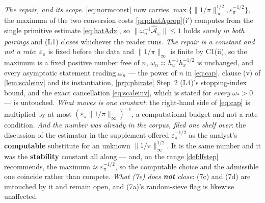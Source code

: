 \begin{remark}
\emph{The repair, and its scope.} \eqref{eq:normconst} now carries
$\max\{\|1/\pi\|_\infty^{1/2},\varepsilon_\pi^{-1/2}\}$, the maximum of the two conversion costs
\cref{prp:hatAprop}\textup{(i$'$)} computes from the single primitive estimate \eqref{eq:hatAdx}, so
$\|\omega_n^{-1}\hat{\mathcal A}_\varphi\|\le1$ holds \emph{surely in both pairings} and \textup{(L1)}
closes whichever the reader runs. \emph{The repair is a constant and not a rate}: $\varepsilon_\pi$ is
fixed before the data and $\|1/\pi\|_\infty$ is finite by C1(ii), so the maximum is a fixed positive
number free of $n$, $\omega_n\asymp h_u^{-1}h_x^{-1/2}$ is unchanged, and every asymptotic statement
reading $\omega_n$ --- the power of $n$ in \eqref{eq:cap}, clause \textup{(v)} of \cref{lem:scaleinv} and
its instantiation, \cref{prp:phirate} Step~2 \textup{(L4)}'s stopping-index bound, and the exact
cancellation \eqref{eq:scaleinv}, which is stated for \emph{every} $\omega_\ast>0$ --- is untouched.
\emph{What moves is one constant}: the right-hand side of \eqref{eq:cap} is multiplied by at most
$(\varepsilon_\pi\|1/\pi\|_\infty)^{-1}$, a computational budget and not a rate condition.
\emph{And the number was already in the corpus, filed one shelf over}: the discussion of the estimator
in the supplement offered $\varepsilon_\pi^{-1/2}$ as the analyst's \textbf{computable} substitute for an
unknown $\|1/\pi\|_\infty^{1/2}$. It is the same number and it was the \textbf{stability} constant all
along --- and, on the range \cref{def:lfstep} recommends, the maximum \emph{is} $\varepsilon_\pi^{-1/2}$,
so the computable choice and the admissible one coincide rather than compete. \emph{What \textup{(7e)}
does \textbf{not} close}: \textup{(7c)} and \textup{(7d)} are untouched by it and remain open, and
\textup{(7a)}'s random-sieve flag is likewise unaffected.


\end{remark}
